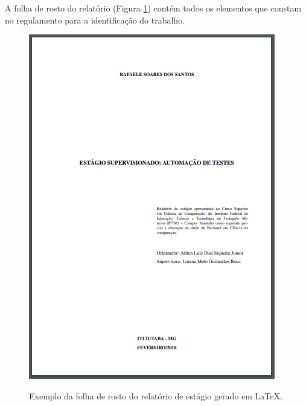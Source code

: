 \newpage
A folha de rosto do relatório (Figura \ref{folharostoest}) contém todos os elementos que constam no regulamento para a identificação do trabalho.\\
\begin{figure}[h]
	\centering
	\includegraphics{imagens/relatorioEstagio/FolhaRosto.png}\\
	\caption{Exemplo da folha de rosto do relatório de estágio gerado em LaTeX.}
	\label{folharostoest}
\end{figure}

